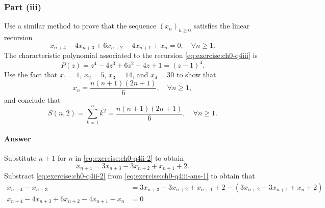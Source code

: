 \subsubsection{Part (iii)}
Use a similar method to prove that the sequence $ (x_n)_{n \geq 0} $ satisfies the linear recursion
\begin{equation}
    x_{n + 4} - 4 x_{n + 3} + 6 x_{n + 2} - 4 x_{n + 1} + x_n = 0, \quad \forall n \geq 1.
    \label{eq:exercise:ch0-q4iii}
\end{equation}
The characteristic polynomial associated to the recursion \eqref{eq:exercise:ch0-q4iii} is
\begin{equation*}
    P(z) = z^4 - 4 z^3 + 6 z^2 - 4 z + 1 = (z - 1)^4.
\end{equation*}
Use the fact that $ x_1 = 1 $, $ x_2 = 5 $, $ x_3 = 14 $, and $ x_4 = 30 $ to show that
\begin{equation*}
    x_n = \frac{n (n + 1) (2 n + 1)}{6}, \quad \forall n \geq 1,
\end{equation*}
and conclude that
\begin{equation*}
    S(n, 2) = \sum_{k=1}^{n} k^2 = \frac{n (n + 1) (2 n + 1)}{6}, \quad \forall n \geq 1.
\end{equation*}

\paragraph{Answer}
Substitute $ n + 1 $ for $ n $ in \eqref{eq:exercise:ch0-q4ii-2} to obtain
\begin{equation}
    x_{n + 4} = 3 x_{n + 3} - 3 x_{n + 2} + x_{n + 1} + 2.
    \label{eq:exercise:ch0-q4iii-ans-1}
\end{equation}
Substract \eqref{eq:exercise:ch0-q4ii-2} from \eqref{eq:exercise:ch0-q4iii-ans-1} to obtain that
\begin{align*}
    x_{n + 4} - x_{n + 3} &= 3 x_{n + 3} - 3 x_{n + 2} + x_{n + 1} + 2 - (3 x_{n + 2} - 3 x_{n + 1} + x_n + 2) \\
    x_{n + 4} - 4 x_{n + 3} + 6 x_{n + 2} - 4 x_{n + 1} - x_n &= 0
\end{align*}


